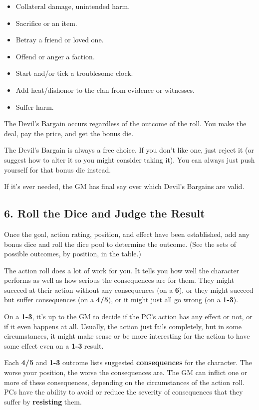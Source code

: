 \begin{itemize}
\item    Collateral damage, unintended harm.
\item    Sacrifice  or an item.
\item    Betray a friend or loved one.
\item    Offend or anger a faction.
\item    Start and/or tick a troublesome clock.
\item    Add heat/dishonor to the clan from evidence or witnesses.
\item    Suffer harm.
\end{itemize}

The Devil’s Bargain occurs regardless of the outcome of the roll. You make the deal, pay the price, and get the bonus die.

The Devil’s Bargain is always a free choice. If you don’t like one, just reject it (or suggest how to alter it so you might consider taking it). You can always just push yourself for that bonus die instead.

If it’s ever needed, the GM has final say over which Devil’s Bargains are valid.

\subsection{6. Roll the Dice and Judge the Result}

Once the goal, action rating, position, and effect have been established, add any bonus dice and roll the dice pool to determine the outcome. (See the sets of possible outcomes, by position, in the table.)

The action roll does a lot of work for you. It tells you how well the character performs as well as how serious the consequences are for them. They might succeed at their action without any consequences (on a \textbf{6}), or they might succeed but suffer consequences (on a \textbf{4/5}), or it might just all go wrong (on a \textbf{1-3}).

On a \textbf{1-3}, it’s up to the GM to decide if the PC’s action has any effect or not, or if it even happens at all. Usually, the action just fails completely, but in some circumstances, it might make sense or be more interesting for the action to have some effect even on a \textbf{1-3} result.

Each \textbf{4/5} and \textbf{1-3} outcome lists suggested \textbf{consequences} for the character. The worse your position, the worse the consequences are. The GM can inflict one or more of these consequences, depending on the circumstances of the action roll. PCs have the ability to avoid or reduce the severity of consequences that they suffer by \textbf{resisting} them.

